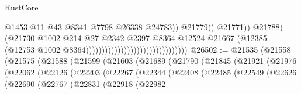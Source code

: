 \begin{lexlean}{RustCore}
\begin{coremodule}
                                                                            @1453
                                                                            @11
                                                                            @43
                                                                            @8341
                                                                            @7798
                                                                            @26338
                                                                            @24783))
                                                                        @21779))
                                                                    @21771))
                                                                @21788)
                                                              (@21730
                                                                @1002
                                                                @214
                                                                @27
                                                                @2342
                                                                @2397
                                                                @8364
                                                                @12524
                                                                @21667
                                                                (@12385
                                                                  (@12753
                                                                    @1002
                                                                    @8364))))))))))))))))))))))))))))))))
@26502 := @21535
    (@21558
      (@21575
        (@21588
          (@21599
            (@21603
              (@21689
                (@21790
                  (@21845
                    (@21921
                      (@21976
                        (@22062
                          (@22126
                            (@22203
                              (@22267
                                (@22344
                                  (@22408
                                    (@22485
                                      (@22549
                                        (@22626
                                          (@22690
                                            (@22767
                                              (@22831
                                                (@22918
                                                  (@22982

\end{coremodule}
\end{lexlean}
